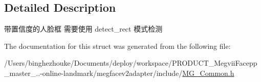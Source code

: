 \subsection{Detailed Description}
带置信度的人脸框 需要使用 detect\+\_\+rect 模式检测 

The documentation for this struct was generated from the following file\+:\begin{DoxyCompactItemize}
\item 
/\+Users/binghezhouke/\+Documents/deploy/workspace/\+P\+R\+O\+D\+U\+C\+T\+\_\+\+Megvii\+Facepp\+\_\+master\+\_..-\/online-\/landmark/megfacev2adapter/include/\hyperlink{_m_g___common_8h}{M\+G\+\_\+\+Common.\+h}\end{DoxyCompactItemize}
